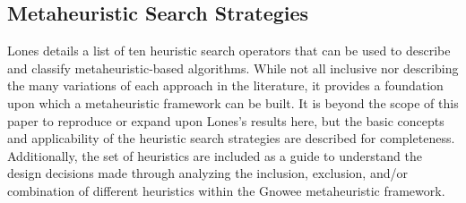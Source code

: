 \documentclass{article}                                                                           %
\begin{document}
\subsection{Metaheuristic Search Strategies} \label{sec:meta}
Lones \cite{Lones2014} details a list of ten heuristic search operators that can be used to describe and classify metaheuristic-based algorithms. 
While not all inclusive nor describing the many variations of each approach in the literature, it provides a foundation upon which a metaheuristic framework can be built.   
It is beyond the scope of this paper to reproduce or expand upon Lones's results here, but the basic concepts and applicability of the heuristic search strategies are described for completeness.
Additionally, the set of heuristics are included as a guide to understand the design decisions made through analyzing the inclusion, exclusion, and/or combination of different heuristics within the Gnowee metaheuristic framework.  
\end{document}
